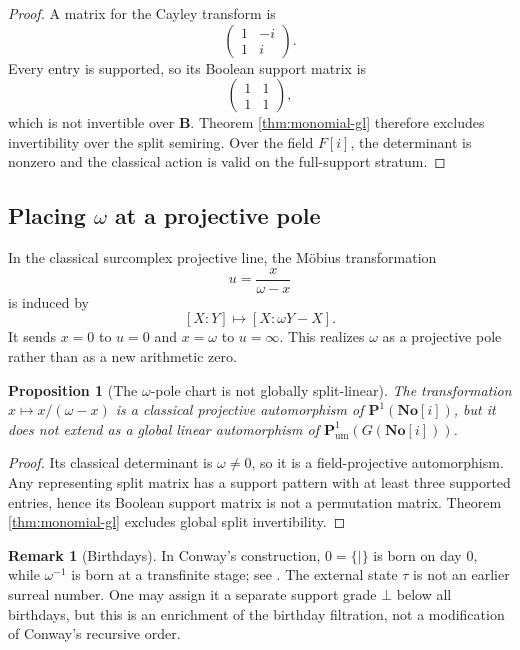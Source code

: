\documentclass[11pt]{amsart}
\numberwithin{equation}{section}
\newtheorem{proposition}[theorem]{Proposition}
\theoremstyle{definition}
\newtheorem{remark}[theorem]{Remark}
\newcommand{\B}{\mathbf B}
\newcommand{\No}{\mathbf{No}}
\newcommand{\Pum}{\mathbf P_{\mathrm{um}}}
\begin{document}
\begin{proof}
A matrix for the Cayley transform is
\[
\begin{pmatrix}
1&-i\\
1&i
\end{pmatrix}.
\]
Every entry is supported, so its Boolean support matrix is
\[
\begin{pmatrix}
1&1\\
1&1
\end{pmatrix},
\]
which is not invertible over $\B$.  Theorem \ref{thm:monomial-gl} therefore excludes invertibility over the split semiring.  Over the field $F[i]$, the determinant is nonzero and the classical action is valid on the full-support stratum.
\end{proof}

\subsection{Placing \texorpdfstring{$\omega$}{omega} at a projective pole}

In the classical surcomplex projective line, the M\"obius transformation
\[
u=\frac{x}{\omega-x}
\]
is induced by
\[
[X:Y]\longmapsto[X:\omega Y-X].
\]
It sends $x=0$ to $u=0$ and $x=\omega$ to $u=\infty$.  This realizes $\omega$ as a projective pole rather than as a new arithmetic zero.

\begin{proposition}[The $\omega$-pole chart is not globally split-linear]\label{prop:omega-pole-obstruction}
The transformation $x\mapsto x/(\omega-x)$ is a classical projective automorphism of $\mathbf P^1(\No[i])$, but it does not extend as a global linear automorphism of $\Pum^1(G(\No[i]))$.
\end{proposition}

\begin{proof}
Its classical determinant is $\omega\neq0$, so it is a field-projective automorphism.  Any representing split matrix has a support pattern with at least three supported entries, hence its Boolean support matrix is not a permutation matrix.  Theorem \ref{thm:monomial-gl} excludes global split invertibility.
\end{proof}

\begin{remark}[Birthdays]
In Conway's construction, $0=\{\mid\}$ is born on day $0$, while $\omega^{-1}$ is born at a transfinite stage; see \cite{Conway,Simons}.  The external state $\tau$ is not an earlier surreal number.  One may assign it a separate support grade $\bot$ below all birthdays, but this is an enrichment of the birthday filtration, not a modification of Conway's recursive order.
\end{remark}
\end{document}
